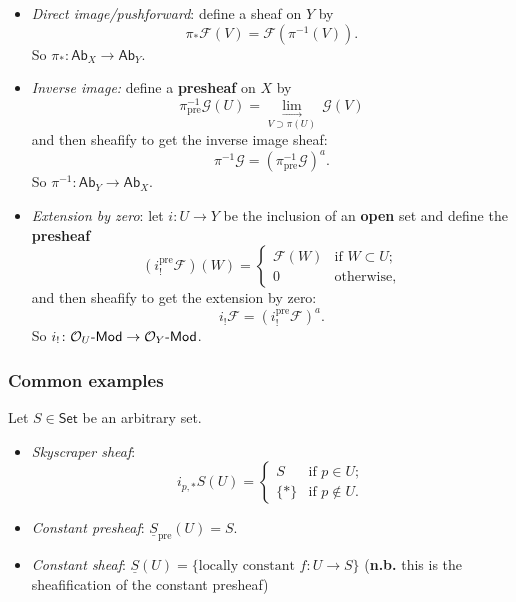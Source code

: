 \documentclass[10pt]{article}
\newcommand{\dirlim}[1]{\underset{#1}{\lim\limits_{\longrightarrow}}\,}
\newcommand{\Set}{\mathsf{Set}}
\newcommand{\Ab}{\mathsf{Ab}}
\newcommand{\Mod}[1]{{#1}\hbox{-}\mathsf{Mod}}
\newcommand{\fsheaf}{\mathcal{F}}
\newcommand{\gsheaf}{\mathcal{G}}
\newcommand{\pre}{\text{pre}}
\renewcommand{\O}{\mathcal{O}}
\begin{document}
                \begin{itemize}
                    \item \textit{Direct image/pushforward}: define a sheaf on $Y$ by
                        \[\pi_*\fsheaf(V) = \fsheaf(\pi^{-1}(V)).\]
                        So $\pi_*\colon\Ab_X\to\Ab_Y$.
                    \item \textit{Inverse image:} define a \textbf{presheaf} on $X$ by \[\pi_\pre^{-1}\gsheaf(U) = \dirlim{V\supset\pi(U)}\gsheaf(V)\]
                        and then sheafify to get the inverse image sheaf: \[\pi^{-1}\gsheaf=(\pi_\pre^{-1}\gsheaf)^a.\]
                        So $\pi^{-1}\colon\Ab_Y\to\Ab_X$.
                    \item \textit{Extension by zero}: let $i\colon U\to Y$ be the inclusion of an \textbf{open} set and define the \textbf{presheaf}
                        \[(i_!^\pre\fsheaf)(W)=\begin{cases}
                            \fsheaf(W) &\text{if }W\subset U;\\
                            0 &\text{otherwise},
                        \end{cases}\]
                        and then sheafify to get the extension by zero:
                        \[i_!\fsheaf=(i_!^\pre\fsheaf)^a.\]
                        So $i_!\colon\Mod{\O_U}\to\Mod{\O_Y}$.
                \end{itemize}
            
            \subsubsection{Common examples}
            
                Let $S\in\Set$ be an arbitrary set.
            
                \begin{itemize}
                    \item \textit{Skyscraper sheaf}:
                        \[i_{p,*}S(U)=\begin{cases}
                            S &\text{if }p\in U;\\
                            \{*\} &\text{if }p\not\in U.
                        \end{cases}\]
                    \item \textit{Constant presheaf}: $\underline{S}_\pre(U)=S$.
                    \item \textit{Constant sheaf}: $\underline{S}(U)=\{\text{locally constant }f\colon U\to S\}$ (\textbf{n.b.} this is the sheafification of the constant presheaf)
                \end{itemize}
\end{document}
